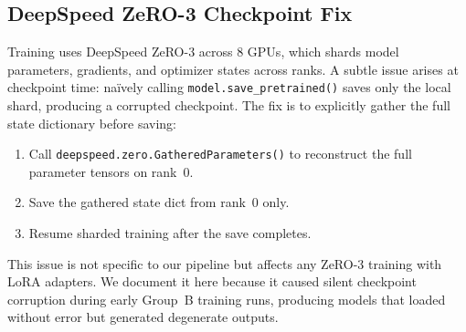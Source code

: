 \subsection{DeepSpeed ZeRO-3 Checkpoint Fix}

Training uses DeepSpeed ZeRO-3 across 8 GPUs, which shards model
parameters, gradients, and optimizer states across ranks. A subtle
issue arises at checkpoint time: na\"ively calling
\texttt{model.save\_pretrained()} saves only the local shard, producing
a corrupted checkpoint. The fix is to explicitly gather the full state
dictionary before saving:

\begin{enumerate}
\item Call \texttt{deepspeed.zero.GatheredParameters()} to reconstruct
    the full parameter tensors on rank~0.
\item Save the gathered state dict from rank~0 only.
\item Resume sharded training after the save completes.
\end{enumerate}

This issue is not specific to our pipeline but affects any ZeRO-3
training with LoRA adapters. We document it here because it caused
silent checkpoint corruption during early Group~B training runs,
producing models that loaded without error but generated degenerate
outputs.
